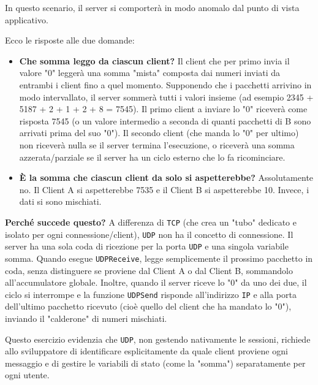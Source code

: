 \documentclass[11pt]{article}
\begin{document}
\begin{tcolorbox}[colback=green!5!white,colframe=green!75!black,title=\textbf{RISPOSTA}, breakable]
In questo scenario, il server si comporterà in modo anomalo dal punto di vista applicativo.

Ecco le risposte alle due domande:

\begin{itemize}
    \item \textbf{Che somma leggo da ciascun client?} Il client che per primo invia il valore "0" leggerà una somma "mista" composta dai numeri inviati da entrambi i client fino a quel momento. Supponendo che i pacchetti arrivino in modo intervallato, il server sommerà tutti i valori insieme (ad esempio 2345 + 5187 + 2 + 1 + 2 + 8 = 7545). Il primo client a inviare lo "0" riceverà come risposta 7545 (o un valore intermedio a seconda di quanti pacchetti di B sono arrivati prima del suo "0"). Il secondo client (che manda lo "0" per ultimo) non riceverà nulla se il server termina l'esecuzione, o riceverà una somma azzerata/parziale se il server ha un ciclo esterno che lo fa ricominciare.
    
    \item \textbf{È la somma che ciascun client da solo si aspetterebbe?} Assolutamente no. Il Client A si aspetterebbe 7535 e il Client B si aspetterebbe 10. Invece, i dati si sono mischiati.
\end{itemize}

\textbf{Perché succede questo?} A differenza di \texttt{TCP} (che crea un "tubo" dedicato e isolato per ogni connessione/client), \texttt{UDP} non ha il concetto di connessione. Il server ha una sola coda di ricezione per la porta \texttt{UDP} e una singola variabile somma. Quando esegue \texttt{UDPReceive}, legge semplicemente il prossimo pacchetto in coda, senza distinguere se proviene dal Client A o dal Client B, sommandolo all'accumulatore globale. Inoltre, quando il server riceve lo "0" da uno dei due, il ciclo si interrompe e la funzione \texttt{UDPSend} risponde all'indirizzo \texttt{IP} e alla porta dell'ultimo pacchetto ricevuto (cioè quello del client che ha mandato lo "0"), inviando il "calderone" di numeri mischiati.

Questo esercizio evidenzia che \texttt{UDP}, non gestendo nativamente le sessioni, richiede allo sviluppatore di identificare esplicitamente da quale client proviene ogni messaggio e di gestire le variabili di stato (come la "somma") separatamente per ogni utente.
\end{tcolorbox}
\end{document}
